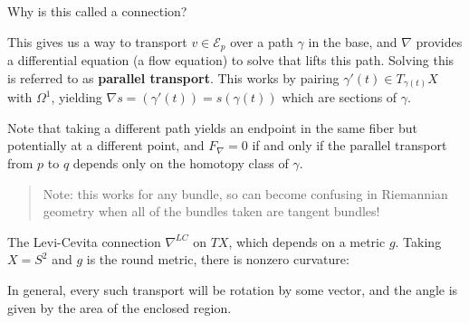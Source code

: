 \begin{remark}

Why is this called a connection?

\begin{figure}
\centering
{}
\end{figure}

This gives us a way to transport \(v\in \mathcal{E}_p\) over a path
\(\gamma\) in the base, and \(\nabla\) provides a differential equation
(a flow equation) to solve that lifts this path. Solving this is
referred to as \textbf{parallel transport}. This works by pairing
\(\gamma'(t) \in T_{ \gamma(t) } X\) with \(\Omega^1\), yielding
\(\nabla s = ( \gamma'(t)) = s( \gamma(t))\) which are sections of
\(\gamma\).

Note that taking a different path yields an endpoint in the same fiber
but potentially at a different point, and \(F_\nabla = 0\) if and only
if the parallel transport from \(p\) to \(q\) depends only on the
homotopy class of \(\gamma\).

\begin{quote}
Note: this works for any bundle, so can become confusing in Riemannian
geometry when all of the bundles taken are tangent bundles!
\end{quote}

\end{remark}

\begin{example}

The Levi-Cevita connection \(\nabla^{LC}\) on \(TX\), which depends on a
metric \(g\). Taking \(X=S^2\) and \(g\) is the round metric, there is
nonzero curvature:

\begin{figure}
\centering
{}
\end{figure}

In general, every such transport will be rotation by some vector, and
the angle is given by the area of the enclosed region.

\end{example}

